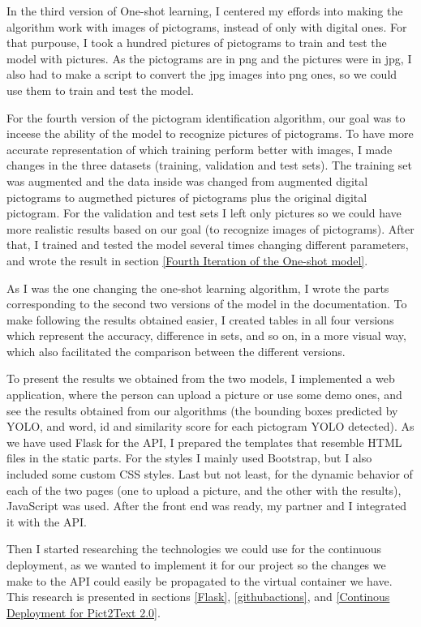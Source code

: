 In the third version of One-shot learning, I centered my effords into making the algorithm work with images of pictograms, instead of only with digital ones. For that purpouse, I took a hundred pictures of pictograms to train and test the model with pictures. As the pictograms are in png and the pictures were in jpg, I also had to make a script to convert the jpg images into png ones, so we could use them to train and test the model. 

For the fourth version of the pictogram identification algorithm, our goal was to inceese the ability of the model to recognize pictures of pictograms. To have more accurate representation of which training perform better with images, I made changes in the three datasets (training, validation and test sets). The training set was augmented and the data inside was changed from augmented digital pictograms to augmethed pictures of pictograms plus the original digital pictogram. For the validation and test sets I left only pictures so we could have more realistic results based on our goal (to recognize images of pictograms). After that, I trained and tested the model several times changing different parameters, and wrote the result in section \ref{Fourth Iteration of the One-shot model}.

As I was the one changing the one-shot learning algorithm, I wrote the parts corresponding to the second two versions of the model in the documentation. To make following the results obtained easier, I created tables in all four versions which represent the accuracy, difference in sets, and so on, in a more visual way, which also facilitated the comparison between the different versions.

To present the results we obtained from the two models, I implemented a web application, where the person can upload a picture or use some demo ones, and see the results obtained from our algorithms (the bounding boxes predicted by YOLO, and word, id and similarity score for each pictogram YOLO detected). As we have used Flask for the API, I prepared the templates that resemble HTML files in the static parts. For the styles I mainly used Bootstrap, but I also included some custom CSS styles. Last but not least, for the dynamic behavior of each of the two pages (one to upload a picture, and the other with the results), JavaScript was used. After the front end was ready, my partner and I integrated it with the API.

Then I started researching the technologies we could use for the continuous deployment, as we wanted to implement it for our project so the changes we make to the API could easily be propagated to the virtual container we have. This research is presented in sections \ref{Flask}, \ref{githubactions}, and \ref{Continous Deployment for Pict2Text 2.0}.

